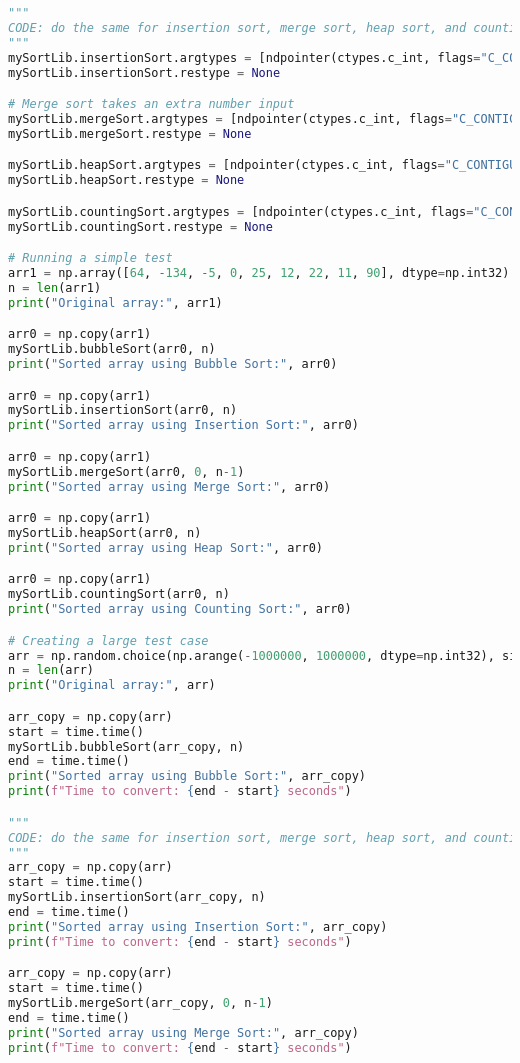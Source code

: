 \documentclass[12pt]{article}
\begin{document}
\begin{lstlisting}[language=python]
"""
CODE: do the same for insertion sort, merge sort, heap sort, and counting sort.
"""
mySortLib.insertionSort.argtypes = [ndpointer(ctypes.c_int, flags="C_CONTIGUOUS"), ctypes.c_int]
mySortLib.insertionSort.restype = None

# Merge sort takes an extra number input
mySortLib.mergeSort.argtypes = [ndpointer(ctypes.c_int, flags="C_CONTIGUOUS"), ctypes.c_int, ctypes.c_int]
mySortLib.mergeSort.restype = None

mySortLib.heapSort.argtypes = [ndpointer(ctypes.c_int, flags="C_CONTIGUOUS"), ctypes.c_int]
mySortLib.heapSort.restype = None

mySortLib.countingSort.argtypes = [ndpointer(ctypes.c_int, flags="C_CONTIGUOUS"), ctypes.c_int]
mySortLib.countingSort.restype = None

# Running a simple test
arr1 = np.array([64, -134, -5, 0, 25, 12, 22, 11, 90], dtype=np.int32)
n = len(arr1)
print("Original array:", arr1)

arr0 = np.copy(arr1)
mySortLib.bubbleSort(arr0, n)
print("Sorted array using Bubble Sort:", arr0)

arr0 = np.copy(arr1)
mySortLib.insertionSort(arr0, n)
print("Sorted array using Insertion Sort:", arr0)

arr0 = np.copy(arr1)
mySortLib.mergeSort(arr0, 0, n-1)
print("Sorted array using Merge Sort:", arr0)

arr0 = np.copy(arr1)
mySortLib.heapSort(arr0, n)
print("Sorted array using Heap Sort:", arr0)

arr0 = np.copy(arr1)
mySortLib.countingSort(arr0, n)
print("Sorted array using Counting Sort:", arr0)

# Creating a large test case
arr = np.random.choice(np.arange(-1000000, 1000000, dtype=np.int32), size=500000, replace=False)
n = len(arr)
print("Original array:", arr)

arr_copy = np.copy(arr)
start = time.time()
mySortLib.bubbleSort(arr_copy, n)
end = time.time()
print("Sorted array using Bubble Sort:", arr_copy)
print(f"Time to convert: {end - start} seconds")

"""
CODE: do the same for insertion sort, merge sort, heap sort, and counting sort.
"""
arr_copy = np.copy(arr)
start = time.time()
mySortLib.insertionSort(arr_copy, n)
end = time.time()
print("Sorted array using Insertion Sort:", arr_copy)
print(f"Time to convert: {end - start} seconds")

arr_copy = np.copy(arr)
start = time.time()
mySortLib.mergeSort(arr_copy, 0, n-1)
end = time.time()
print("Sorted array using Merge Sort:", arr_copy)
print(f"Time to convert: {end - start} seconds")


\end{lstlisting}
\end{document}
